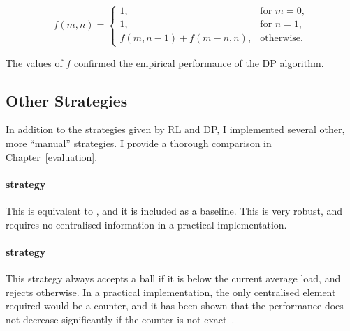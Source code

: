 \begin{equation} \label{eq: numberofpartitions}
    f(m, n) = \begin{cases}
        1, & \text{for } m=0,\\
        1, & \text{for } n=1,\\
        f(m,n-1)+f(m-n,n), & \text{otherwise}.
    \end{cases}
\end{equation}




The values of $f$ confirmed the empirical performance of the DP algorithm.

\subsection{Other Strategies}

In addition to the strategies given by RL and DP, I implemented several other, more ``manual'' strategies. I provide a thorough comparison in Chapter~\ref{evaluation}.


\paragraph{\AlwaysAccept strategy}
This is equivalent to \OneChoice, and it is included as a baseline. This is very robust, and requires no centralised information in a practical implementation.


\paragraph{\MeanThinning strategy}
This strategy always accepts a ball if it is below the current average load, and rejects otherwise. In a practical implementation, the only centralised element required would be a counter, and it has been shown that the performance does not decrease significantly if the counter is not exact~\cite{los2022cachingpackingthinningtwinning}. 


